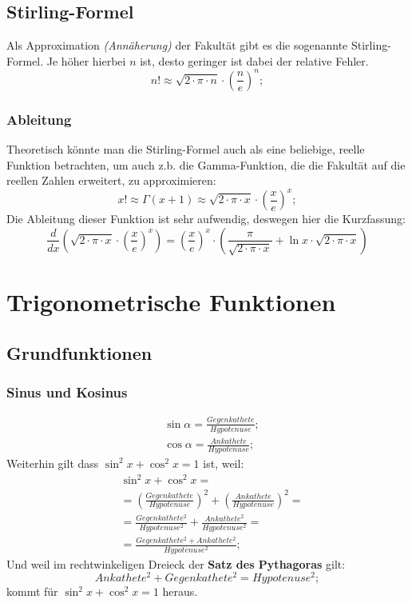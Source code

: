 \documentclass[a4paper]{article}
\begin{document}
\subsection{Stirling-Formel}
Als Approximation \textit{(Ann\"aherung)} der Fakult\"at gibt es die sogenannte Stirling-Formel.
Je h\"oher hierbei $n$ ist,
desto geringer ist dabei der relative Fehler.
\[
	n! \approx \sqrt{2 \cdot \pi \cdot n} \cdot \left( \frac{n}{e} \right) ^n ;
\]

\subsubsection{Ableitung}
Theoretisch k\"onnte man die Stirling-Formel auch als eine beliebige,
reelle Funktion betrachten,
um auch z.b. die Gamma-Funktion,
die die Fakult\"at auf die reellen Zahlen erweitert,
zu approximieren:
\[
	x! \approx \Gamma(x + 1) \approx \sqrt{2 \cdot \pi \cdot x} \cdot \left( \frac{x}{e} \right) ^x ;
\]
Die Ableitung dieser Funktion ist sehr aufwendig, deswegen hier die Kurzfassung:
\[
	\frac{d}{dx} \left( \sqrt{2 \cdot \pi \cdot x} \cdot \left( \frac{x}{e} \right) ^x \right) = \left( \frac{x}{e} \right) ^x \cdot \left( \frac{\pi}{\sqrt{2 \cdot \pi \cdot x}} + \ln{x} \cdot \sqrt{2 \cdot \pi \cdot x} \right)
\]

\section{Trigonometrische Funktionen}

\subsection{Grundfunktionen}

\subsubsection{Sinus und Kosinus}
\begin{align*}
	&\sin{\alpha} = \frac{Gegenkathete}{Hypotenuse} ;
	\\
	&\cos{\alpha} = \frac{Ankathete}{Hypotenuse} ;
\end{align*}
Weiterhin gilt dass $ \sin^2{x} + \cos^2{x} = 1 $ ist,
weil:
\begin{align*}
	& \sin^2{x} + \cos^2{x} = \\
	& = \left( \frac{Gegenkathete}{Hypotenuse} \right) ^2 + \left( \frac{Ankathete}{Hypotenuse} \right) ^ 2 = \\
	& = \frac{Gegenkathete^2}{Hypotenuse^2} + \frac{Ankathete^2}{Hypotenuse^2} = \\
	& = \frac{Gegenkathete^2 + Ankathete^2}{Hypotenuse^2} ;
\end{align*}
Und weil im rechtwinkeligen Dreieck der \textbf{Satz des Pythagoras} gilt:
\[
Ankathete^2 + Gegenkathete^2 = Hypotenuse^2 ;
\]
kommt f\"ur $ \sin^2{x} + \cos^2{x} = 1 $ heraus.
\end{document}
